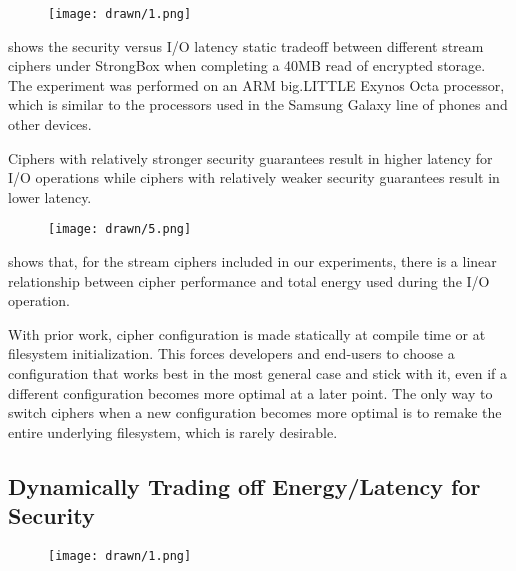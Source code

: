 \begin{figure}[ht]
 \centering
  \texttt{[image: drawn/1.png]}
   \caption{}\label{fig:40mb-read}
\end{figure}

 shows the security versus I/O latency static
tradeoff between different stream ciphers under StrongBox when completing a 40MB
read of encrypted storage. The experiment was performed on an ARM big.LITTLE
Exynos Octa processor, which is similar to the processors used in the Samsung
Galaxy line of phones and other devices. 

Ciphers with relatively stronger security guarantees result in higher latency
for I/O operations while ciphers with relatively weaker security guarantees
result in lower latency.

\begin{figure}[ht]
 \centering
  \texttt{[image: drawn/5.png]}
   \caption{}\label{fig:energy-latency-linearity}
\end{figure}

 shows that, for the stream ciphers included in
our experiments, there is a linear relationship between cipher performance and
total energy used during the I/O operation.

With prior work,  cipher configuration is made
statically at compile time or at filesystem initialization. This forces
developers and end-users to choose a configuration that works best in the most
general case and stick with it, even if a different configuration becomes more
optimal at a later point. The only way to switch ciphers when a new
configuration becomes more optimal is to remake the entire underlying
filesystem, which is rarely desirable. 

\subsection{Dynamically Trading off Energy/Latency for Security}

\begin{figure}[ht]
 \centering
  \texttt{[image: drawn/1.png]}
   \caption{}\label{fig:40mb-read-with-forward}
\end{figure}


